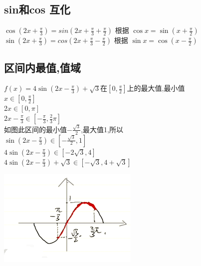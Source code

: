 \documentclass[hyperref, UTF8,11pt,a4paper]{ctexart} %
\begin{document}

\subsection {sin和cos 互化}

$\cos \left(2 x+\frac{\pi}{3}\right) = sin\left(2 x+\frac{\pi}{3}+\frac{\pi}{2}\right)$  \quad 根据 $\cos x=\sin \left(x+\frac{\pi}{2}\right)$ \\
$\sin \left(2 x+\frac{\pi}{3}\right) = cos\left(2 x+\frac{\pi}{3}-\frac{\pi}{2}\right)$  \quad 根据 $\sin x=\cos \left(x-\frac{\pi}{2}\right)$


\subsection{区间内最值,值域}

\begin{minipage}[!h]{0.5\linewidth}
	{\color{red}   $f(x)=4 \sin \left(2 x-\frac{\pi}{3}\right)+\sqrt{3}$在$\left[0, \frac{\pi}{2}\right]$上的最大值,最小值 } \\
	$x \in\left[0, \frac{\pi}{2}\right]$ \\
	2$x \in[0, \pi]$ \\
	$2 x-\frac{\pi}{3} \in\left[-\frac{\pi}{3}, \frac{2}{3} \pi\right]$ \\
	如图此区间的最小值$-\frac{\sqrt{3}}{2}$,最大值1,所以 \\
	$ \sin\left(2 x-\frac{\pi}{3}\right) \in\left[-\frac{\sqrt{3}}{2}, 1\right]$ \\
	$4 \sin \left(2 x-\frac{\pi}{3}\right) \in[-2 \sqrt{3}, 4]$ \\
	$4 \sin \left(2 x-\frac{\pi}{3}\right)+\sqrt{3} \in[-\sqrt{3}, 4+\sqrt{3}]$
\end{minipage}
\hfill
\begin{minipage}[!h]{0.5\linewidth}
	\includegraphics[scale=0.8]{pic/sanjiaohanshu/qujianneizuizhi.png}
\end{minipage}
\end{document}
